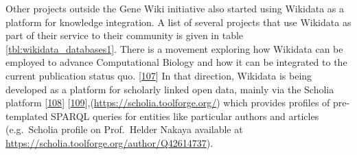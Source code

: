 Other projects outside the Gene Wiki initiative also started using Wikidata as a platform for knowledge integration.
A list of several projects that use Wikidata as part of their service to their community is given in table \ref{tbl:wikidata_databases1}.
There is a movement exploring how Wikidata can be employed to advance Computational Biology and how it can be integrated to the current publication status quo. {[}\protect\hyperlink{ref-1GijvCQtv}{107}{]}
In that direction, Wikidata is being developed as a platform for scholarly linked open data, mainly via the Scholia platform {[}\protect\hyperlink{ref-hxzL9pmm}{108}{]} {[}\protect\hyperlink{ref-PdG2G4Bp}{109}{]},(\url{https://scholia.toolforge.org/}) which provides profiles of pre-templated SPARQL queries for entities like particular authors and articles (e.g.~Scholia profile on Prof.~Helder Nakaya available at \url{https://scholia.toolforge.org/author/Q42614737}).


